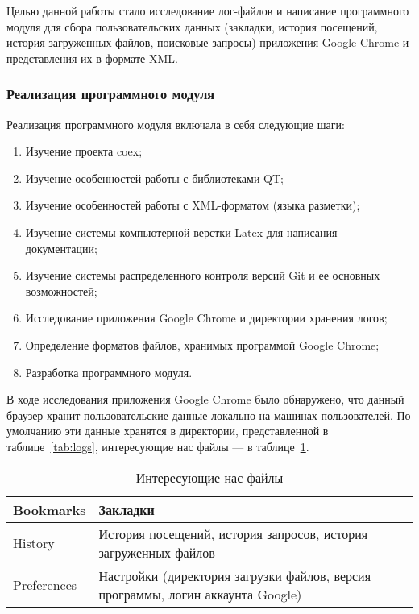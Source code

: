 
Целью данной работы стало исследование лог-файлов и написание программного модуля для сбора пользовательских данных (закладки, история посещений, история загруженных файлов, поисковые запросы) приложения Google Chrome и представления их в формате XML.

\subsubsection{Реализация программного модуля}

Реализация программного модуля включала в себя следующие шаги:

\begin{enumerate}
\item Изучение проекта coex;
\item Изучение особенностей работы с библиотеками QT;
\item Изучение особенностей работы с XML-форматом (языка разметки);
\item Изучение системы компьютерной верстки  Latex для написания документации;
\item Изучение системы распределенного контроля версий Git и ее основных возможностей; 
\item Исследование приложения Google Chrome и директории хранения логов;
\item Определение форматов файлов, хранимых программой Google Chrome;
\item Разработка программного модуля.
\end{enumerate}

В ходе исследования приложения Google Chrome было обнаружено, что данный браузер хранит пользовательские данные локально на машинах пользователей. По умолчанию эти данные хранятся в директории, представленной в таблице~\ref{tab:logs}, интересующие нас файлы --- в таблице~\ref{tab:files}.

\begin{table}[ht]
\caption{Интересующие нас файлы}
\label{tab:files}
\begin{center}
\begin{tabularx}{\linewidth}{|l|X|}
\hline
Bookmarks & Закладки \\
\hline
History & История посещений, история запросов, история загруженных файлов \\
\hline
Preferences & Настройки (директория загрузки файлов, версия программы, логин аккаунта Google) \\
\hline
\end{tabularx}
\end{center}
\end{table}


